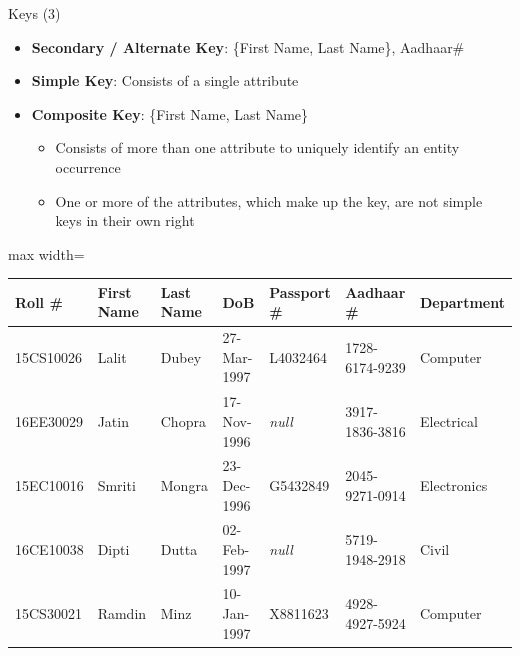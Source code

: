 \documentclass[aspectratio=169, xcolor=dvipsnames]{beamer}
\begin{document}
\begin{frame}{Keys (3)}
    \begin{itemize}
        \item \textbf{Secondary / Alternate Key}: \{First Name, Last Name\}, Aadhaar\#
        \item \textbf{Simple Key}: Consists of a single attribute
        \item \textbf{Composite Key}: \{First Name, Last Name\}
        \begin{itemize}
            \item Consists of more than one attribute to uniquely identify an entity occurrence
            \item One or more of the attributes, which make up the key, are not simple keys in their own right
        \end{itemize}
    \end{itemize}
    
    \vspace{0.5em}
    \begin{center}
        \begin{adjustbox}{max width=\textwidth}
        \begin{tabular}{|l|l|l|l|l|l|l|}
        \hline
        \textbf{Roll \#} & \textbf{First Name} & \textbf{Last Name} & \textbf{DoB} & \textbf{Passport \#} & \textbf{Aadhaar \#} & \textbf{Department} \\ \hline
        15CS10026 & Lalit & Dubey & 27-Mar-1997 & L4032464 & 1728-6174-9239 & Computer \\ \hline
        16EE30029 & Jatin & Chopra & 17-Nov-1996 & \textit{null} & 3917-1836-3816 & Electrical \\ \hline
        15EC10016 & Smriti & Mongra & 23-Dec-1996 & G5432849 & 2045-9271-0914 & Electronics \\ \hline
        16CE10038 & Dipti & Dutta & 02-Feb-1997 & \textit{null} & 5719-1948-2918 & Civil \\ \hline
        15CS30021 & Ramdin & Minz & 10-Jan-1997 & X8811623 & 4928-4927-5924 & Computer \\ \hline
        \end{tabular}
        \end{adjustbox}
    \end{center}
\end{frame}
\end{document}
